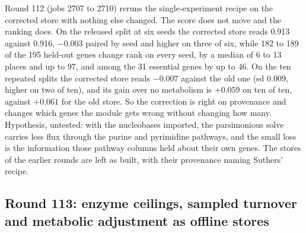Round 112 (jobs 2707 to 2710) reruns the single-experiment recipe on the corrected store
with nothing else changed. The score does not move and the ranking does. On the released
split at six seeds the corrected store reads 0.913 against 0.916, $-0.003$ paired by
seed and higher on three of six, while 182 to 189 of the 195 held-out genes change rank
on every seed, by a median of 6 to 13 places and up to 97, and among the 31 essential
genes by up to 46. On the ten repeated splits the corrected store reads $-0.007$ against
the old one (sd 0.009, higher on two of ten), and its gain over no metabolism is
$+0.059$ on ten of ten, against $+0.061$ for the old store. So the correction is right on
provenance and changes which genes the module gets wrong without changing how many.
Hypothesis, untested: with the nucleobases imported, the parsimonious solve carries less
flux through the purine and pyrimidine pathways, and the small loss is the information
those pathway columns held about their own genes. The stores of the earlier rounds are
left as built, with their provenance naming Suthers' recipe.

\subsection{Round 113: enzyme ceilings, sampled turnover and metabolic adjustment as offline stores}
\label{sec:round113}

